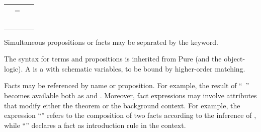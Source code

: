 \begin{isabellebody}
\begin{isamarkuptext}
\begin{tabular}{rcl}
    \isa{goal} & = & \hyperlink{command.have}{\mbox{\isa{\isacommand{have}}}}~\isa{{\isaliteral{22}{\isachardoublequote}}name{\isaliteral{3A}{\isacharcolon}}\ props\ proof{\isaliteral{22}{\isachardoublequote}}} \\
    & \isa{{\isaliteral{22}{\isachardoublequote}}{\isaliteral{7C}{\isacharbar}}{\isaliteral{22}{\isachardoublequote}}} & \hyperlink{command.show}{\mbox{\isa{\isacommand{show}}}}~\isa{{\isaliteral{22}{\isachardoublequote}}name{\isaliteral{3A}{\isacharcolon}}\ props\ proof{\isaliteral{22}{\isachardoublequote}}} \\
  \end{tabular}

  \medskip Simultaneous propositions or facts may be separated by the
  \hyperlink{keyword.and}{\mbox{}} keyword.

  \medskip The syntax for terms and propositions is inherited from
  Pure (and the object-logic).  A  is a  with schematic variables, to be bound by higher-order
  matching.

  \medskip Facts may be referenced by name or proposition.  For
  example, the result of ``\hyperlink{command.have}{\mbox{}}~''
  becomes available both as  and
  \isacharbackquoteopen{}\isacharbackquoteclose.  Moreover,
  fact expressions may involve attributes that modify either the
  theorem or the background context.  For example, the expression
  ``'' refers to the composition of two facts
  according to the \hyperlink{inference.resolution}{\mbox{}} inference of
  , while ``''
  declares a fact as introduction rule in the context.


\end{isamarkuptext}
\end{isabellebody}
